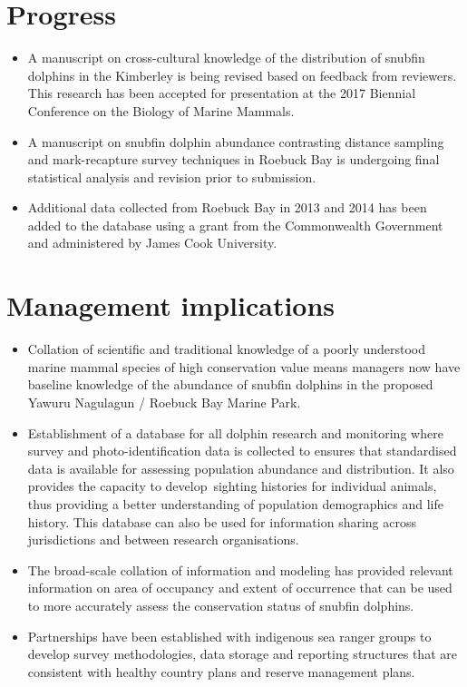 \documentclass[version=last,
    paper=a4, %
    10pt, %
    usenames,
    dvipsnames,
    oneside, %
    headings=openany, %
    DIV=15 %
]{scrbook}
\begin{document}
\section*{Progress}

\begin{itemize}
\itemsep1pt\parskip0pt
\item
  A manuscript on cross-cultural knowledge of the distribution of
  snubfin dolphins in the Kimberley is being revised based on feedback
  from reviewers. This research has been accepted for presentation at
  the 2017 Biennial Conference on the Biology of Marine Mammals.
\item
  A manuscript on snubfin dolphin abundance contrasting distance
  sampling and mark-recapture survey techniques in Roebuck Bay is
  undergoing final statistical analysis and revision prior to
  submission.
\item
  Additional data collected from Roebuck Bay in 2013 and 2014 has been
  added to the database using a grant from the Commonwealth Government
  and administered by James Cook University.
\end{itemize}




\section*{Management implications}

\begin{itemize}
\itemsep1pt\parskip0pt
\item
  Collation of scientific and traditional knowledge of a poorly
  understood marine mammal species of high conservation value means
  managers now have baseline knowledge of the abundance of snubfin
  dolphins in the proposed Yawuru Nagulagun / Roebuck Bay Marine Park.
\item
  Establishment of a database for all dolphin research and monitoring
  where survey and photo-identification data is collected to ensures
  that standardised data is available for assessing population abundance
  and distribution. It also provides the capacity to develop~sighting
  histories for individual animals, thus providing a better
  understanding of population demographics and life history. This
  database can also be used for information sharing across jurisdictions
  and between research organisations.
\item
  The broad-scale collation of information and modeling has provided
  relevant information on area of occupancy and extent of occurrence
  that can be used to more accurately assess the conservation status of
  snubfin dolphins.
\item
  Partnerships have been established with indigenous sea ranger groups
  to develop survey methodologies, data storage and reporting structures
  that are consistent with healthy country plans and reserve management
  plans.
\end{itemize}
\end{document}
